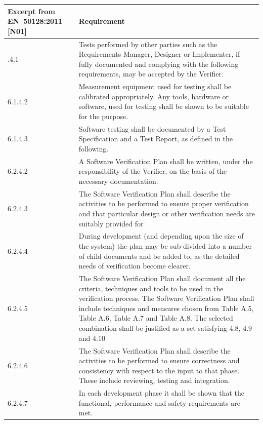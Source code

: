 \documentclass{template/openetcs_report}
\begin{document}
{\footnotesize\sffamily\centering
  \begin{longtable}{||p{}|p{}||}
    \hline\hline
    \textbf{Excerpt from EN~50128:2011 [N01]} & \textbf{Requirement} \\
    \hline\hline
    \endhead
    \hline\hline
    \endfoot
    6.1.4.1 & Tests performed by other parties such as the
    Requirements Manager, Designer or Implementer, if fully documented
    and complying with the following requirements, may be accepted by
    the Verifier.
    \\
    \hline 6.1.4.2 & Measurement equipment used for testing shall be
    calibrated appropriately.  Any tools, hardware or software, used
    for testing shall be shown to be suitable for the purpose.
    \\
    \hline 6.1.4.3 & Software testing shall be documented by a Test
    Specification and a Test Report, as defined in the following.
    \\
    \hline 6.2.4.2 & A Software Verification Plan shall be written,
    under the responsibility of the Verifier, on the basis of the
    necessary documentation.
    \\
    \hline 6.2.4.3 & The Software Verification Plan shall describe the
    activities to be performed to ensure proper verification and that
    particular design or other verification needs are suitably
    provided for
    \\
    \hline 6.2.4.4 & During development (and depending upon the size
    of the system) the plan may be sub-divided into a number of child
    documents and be added to, as the detailed needs of verification
    become clearer.
    \\
    \hline 6.2.4.5 & The Software Verification Plan shall document all
    the criteria, techniques and tools to be used in the verification
    process.  The Software Verification Plan shall include techniques
    and measures chosen from Table A.5, Table A.6, Table A.7 and Table
    A.8.  The selected combination shall be justified as a set
    satisfying 4.8, 4.9 and 4.10
    \\
    \hline 6.2.4.6 & The Software Verification Plan shall describe the
    activities to be performed to ensure correctness and consistency
    with respect to the input to that phase. These include reviewing,
    testing and integration.
    \\
    \hline 6.2.4.7 & In each development phase it shall be shown that
    the functional, performance and safety requirements are met.

\end{longtable}}
\end{document}
